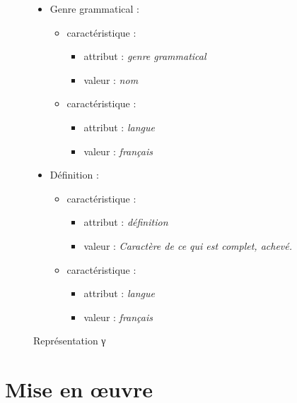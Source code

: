 \documentclass[10pt]{report}
\newcommand{\entité}[1]{\textcolor{blue!80!black}{#1}}
\newcommand{\caractéristique}[1]{\textcolor{green!60!black}{#1}}
\begin{document}
\begin{figure}[h]
\begin{minipage}{0.5\linewidth}
\begin{itemize}
\begin{itemize}
\begin{itemize}
        \end{itemize}
        \item \entité{Genre grammatical} :
        \begin{itemize}
        	\item \entité{caractéristique} :
        	\begin{itemize}
            \item \caractéristique{attribut} : \textit{genre grammatical}
            \item \caractéristique{valeur} : \textit{nom}
        	\end{itemize}
        	\item \entité{caractéristique} :
        	\begin{itemize}
            \item \caractéristique{attribut} : \textit{langue}
            \item \caractéristique{valeur} : \textit{français}
        	\end{itemize}
        \end{itemize}
        \item \entité{Définition} :
                \begin{itemize}
        	\item \entité{caractéristique} :
        	\begin{itemize}
            \item \caractéristique{attribut} : \textit{définition}
            \item \caractéristique{valeur} : \textit{Caractère de ce qui est complet, achevé.}
        	\end{itemize}
        	\item \entité{caractéristique} :
        	\begin{itemize}
            \item \caractéristique{attribut} : \textit{langue}
            \item \caractéristique{valeur} : \textit{français}
        	\end{itemize}
        \end{itemize}
    	\end{itemize}
    \end{itemize}
	\end{minipage}
	\caption{Représentation γ}
	\label{rep-γ}
\end{figure}

\chapter{Mise en œuvre}
\end{document}
